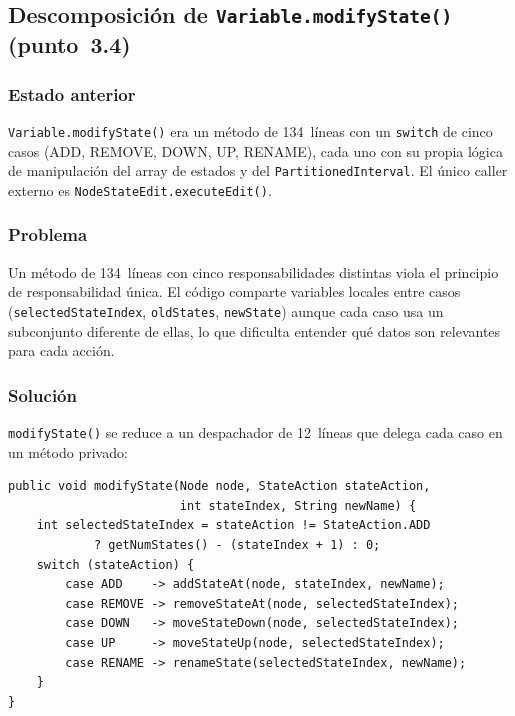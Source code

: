 \documentclass[11pt,a4paper]{article}
\newcommand{\code}[1]{\texttt{#1}}
\begin{document}
\subsection{Descomposición de \code{Variable.modifyState()} (punto~3.4)}

\subsubsection*{Estado anterior}

\code{Variable.modifyState()} era un método de 134~líneas con un
\code{switch} de cinco casos (ADD, REMOVE, DOWN, UP, RENAME), cada
uno con su propia lógica de manipulación del array de estados y del
\code{PartitionedInterval}. El único caller externo es
\code{NodeStateEdit.executeEdit()}.

\subsubsection*{Problema}

Un método de 134~líneas con cinco responsabilidades distintas viola
el principio de responsabilidad única. El código comparte variables
locales entre casos (\code{selectedStateIndex}, \code{oldStates},
\code{newState}) aunque cada caso usa un subconjunto diferente de
ellas, lo que dificulta entender qué datos son relevantes para cada
acción.

\subsubsection*{Solución}

\code{modifyState()} se reduce a un despachador de 12~líneas que
delega cada caso en un método privado:

\begin{lstlisting}
public void modifyState(Node node, StateAction stateAction,
                        int stateIndex, String newName) {
    int selectedStateIndex = stateAction != StateAction.ADD
            ? getNumStates() - (stateIndex + 1) : 0;
    switch (stateAction) {
        case ADD    -> addStateAt(node, stateIndex, newName);
        case REMOVE -> removeStateAt(node, selectedStateIndex);
        case DOWN   -> moveStateDown(node, selectedStateIndex);
        case UP     -> moveStateUp(node, selectedStateIndex);
        case RENAME -> renameState(selectedStateIndex, newName);
    }
}
\end{lstlisting}
\end{document}
